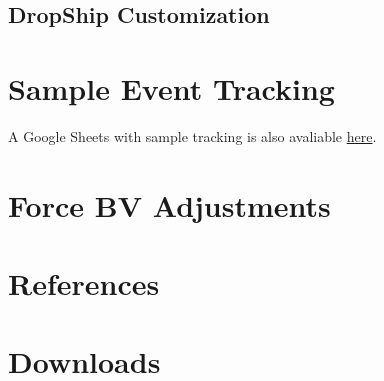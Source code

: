 \documentclass{article}
\newcommand{\mysectiontitle}{}
\newcommand{\newsection}[2]{\renewcommand{\mysectiontitle}{#2}\section{#1}}
\begin{document}


\subsection{DropShip Customization}



\newpage

\newsection{Sample Event Tracking}{sample-tracking-event}
\label{sec:sample_tracking_event}

A Google Sheets with sample tracking is also avaliable \href{https://docs.google.com/spreadsheets/d/17bFS4qAbdIUJQ173NxxHDCCGLD_BG0LDdHGekpoF5M0/copy}{here}.



\newpage

\newsection{Force BV Adjustments}{bv-adjustments}
\label{sec:force_bv_adjustments}



\newpage

\newsection{References}{references}
\label{sec:references}



\newpage

\newsection{Downloads}{downloads}
\label{sec:downloads}



\newpage
\end{document}
